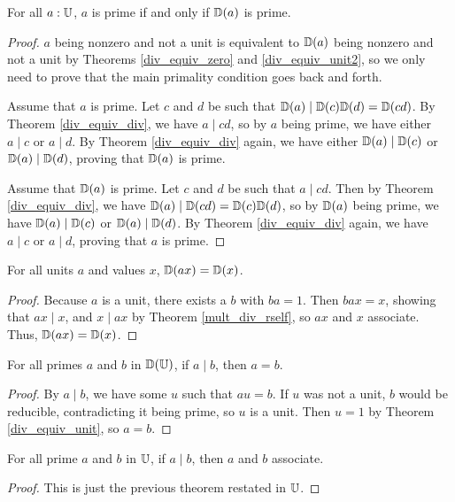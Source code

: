 \documentclass[../../math.tex]{subfiles}
\begin{document}
\begin{theorem} \label{div_equiv_prime}
    For all $a : \mathbb{U}$, $a$ is prime if and only if $\mathbb{D}(a)$ is prime.
\end{theorem}
\begin{proof}
    $a$ being nonzero and not a unit is equivalent to $\mathbb{D}(a)$ being nonzero and
    not a unit by Theorems \ref{div_equiv_zero} and \ref{div_equiv_unit2}, so we
    only need to prove that the main primality condition goes back and forth.

    Assume that $a$ is prime.  Let $c$ and $d$ be such that $\mathbb{D}(a) \mid \mathbb{D}(c)
    \mathbb{D}(d) = \mathbb{D}(cd)$.  By Theorem \ref{div_equiv_div}, we have $a \mid cd$, so by
    $a$ being prime, we have either $a \mid c$ or $a \mid d$.  By Theorem
    \ref{div_equiv_div} again, we have either $\mathbb{D}(a) \mid \mathbb{D}(c)$ or $\mathbb{D}(a) \mid
    \mathbb{D}(d)$, proving that $\mathbb{D}(a)$ is prime.

    Assume that $\mathbb{D}(a)$ is prime.  Let $c$ and $d$ be such that $a \mid cd$.
    Then by Theorem \ref{div_equiv_div}, we have $\mathbb{D}(a) \mid \mathbb{D}(cd) = \mathbb{D}(c)
    \mathbb{D}(d)$, so by $\mathbb{D}(a)$ being prime, we have $\mathbb{D}(a) \mid \mathbb{D}(c)$ or $\mathbb{D}(a) \mid
    \mathbb{D}(d)$.  By Theorem \ref{div_equiv_div} again, we have $a \mid c$ or $a \mid
    d$, proving that $a$ is prime.
\end{proof}

\begin{theorem} \label{div_unit_eq}
    For all units $a$ and values $x$, $\mathbb{D}(ax) = \mathbb{D}(x)$.
\end{theorem}
\begin{proof}
    Because $a$ is a unit, there exists a $b$ with $ba = 1$.  Then $bax = x$,
    showing that $ax \mid x$, and $x \mid ax$ by Theorem \ref{mult_div_rself},
    so $ax$ and $x$ associate.  Thus, $\mathbb{D}(ax) = \mathbb{D}(x)$.
\end{proof}

\begin{theorem} \label{primes_div_equiv}
    For all primes $a$ and $b$ in $\mathbb{D}(\mathbb{U})$, if $a \mid b$, then $a = b$.
\end{theorem}
\begin{proof}
    By $a \mid b$, we have some $u$ such that $au = b$.  If $u$ was not a unit,
    $b$ would be reducible, contradicting it being prime, so $u$ is a unit.
    Then $u = 1$ by Theorem \ref{div_equiv_unit}, so $a = b$.
\end{proof}

\begin{theorem} \label{primes_div}
    For all prime $a$ and $b$ in $\mathbb{U}$, if $a \mid b$, then $a$ and $b$
    associate.
\end{theorem}
\begin{proof}
    This is just the previous theorem restated in $\mathbb{U}$.
\end{proof}
\end{document}
